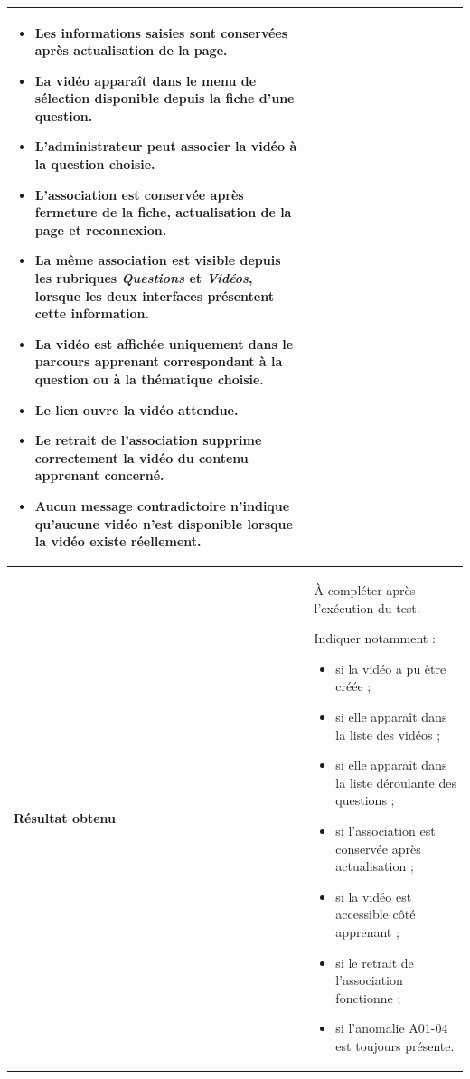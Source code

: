 \begin{longtable}{
    |>{\raggedright\arraybackslash}p{}
    |>{\raggedright\arraybackslash}p{}|
}
\begin{itemize}[leftmargin=*,nosep]
    \item Les informations saisies sont conservées après actualisation de
    la page.

    \item La vidéo apparaît dans le menu de sélection disponible depuis la
    fiche d'une question.

    \item L'administrateur peut associer la vidéo à la question choisie.

    \item L'association est conservée après fermeture de la fiche,
    actualisation de la page et reconnexion.

    \item La même association est visible depuis les rubriques
    \textit{Questions} et \textit{Vidéos}, lorsque les deux interfaces
    présentent cette information.

    \item La vidéo est affichée uniquement dans le parcours apprenant
    correspondant à la question ou à la thématique choisie.

    \item Le lien ouvre la vidéo attendue.

    \item Le retrait de l'association supprime correctement la vidéo du
    contenu apprenant concerné.

    \item Aucun message contradictoire n'indique qu'aucune vidéo n'est
    disponible lorsque la vidéo existe réellement.
\end{itemize}
\\
\hline

\textbf{Résultat obtenu}
&
À compléter après l'exécution du test.

Indiquer notamment :
\begin{itemize}[leftmargin=*,nosep]
    \item si la vidéo a pu être créée ;
    \item si elle apparaît dans la liste des vidéos ;
    \item si elle apparaît dans la liste déroulante des questions ;
    \item si l'association est conservée après actualisation ;
    \item si la vidéo est accessible côté apprenant ;
    \item si le retrait de l'association fonctionne ;
    \item si l'anomalie A01-04 est toujours présente.
\end{itemize}
\\
\hline


\end{longtable}
